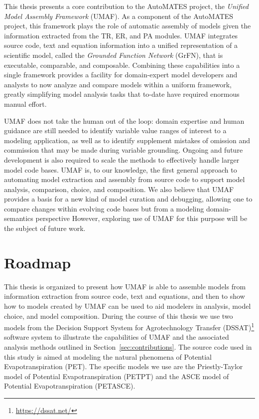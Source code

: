 This thesis presents a core contribution to the AutoMATES project, the \emph{Unified Model Assembly Framework} (UMAF).
As a component of the AutoMATES project, this framework plays the role of automatic assembly of models given the information extracted from the TR, ER, and PA modules.
UMAF integrates source code, text and equation information into a unified representation of a scientific model, called the \emph{Grounded Function Network} (GrFN), that is executable, comparable, and composable.
Combining these capabilities into a single framework provides a facility for domain-expert model developers and analysts to now analyze and compare models within a uniform framework, greatly simplifying model analysis tasks that to-date have required enormous manual effort.

UMAF does not take the human out of the loop: domain expertise and human guidance are still needed to identify variable value ranges of interest to a modeling application, as well as to identify supplement mistakes of omission and commission that may be made during variable grounding.
Ongoing and future development is also required to scale the methods to effectively handle larger model code bases.
UMAF is, to our knowledge, the first general approach to automating model extraction and assembly from source code to support model analysis, comparison, choice, and composition.
We also believe that UMAF provides a basis for a new kind of model curation and debugging, allowing one to compare changes within evolving code bases but from a modeling domain-semantics perspective
However, exploring use of UMAF for this purpose will be the subject of future work.

\section{Roadmap\label{sec:roadmap}}
This thesis is organized to present how UMAF is able to assemble models from information extraction from source code, text and equations, and then to show how to models created by UMAF can be used to aid modelers in analysis, model choice, and model composition.
During the course of this thesis we use two models from the Decision Support System for Agrotechnology Transfer (DSSAT)\footnote{\url{https://dssat.net/}} software system \citep{DSSAT} to illustrate the capabilities of UMAF and the associated analysis methods outlined in Section~\ref{sec:contributions}.
The source code used in this study is aimed at modeling the natural phenomena of Potential Evapotranspiration (PET).
The specific models we use are the Priestly-Taylor model of Potential Evapotranspiration (PETPT) and the ASCE model of Potential Evapotranspiration (PETASCE).

